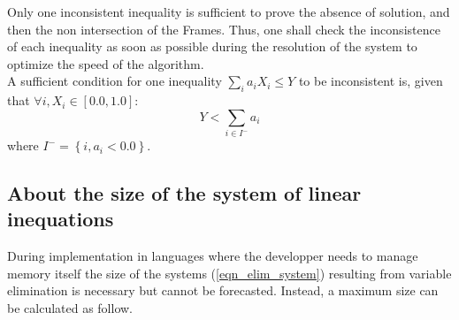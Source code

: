 \documentclass[12pt, a4paper]{article}
\begin{document}
Only one inconsistent inequality is sufficient to prove the absence of solution, and then the non intersection of the Frames. Thus, one shall check the inconsistence of each inequality as soon as possible during the resolution of the system to optimize the speed of the algorithm.\\

A sufficient condition for one inequality $\sum_ia_iX_i\le Y$ to be inconsistent is, given that $\forall i,X_i\in[0.0,1.0]$:
\begin{equation}
Y<\sum_{i\in I^-}a_i
\end{equation}
where $I^-=\left\lbrace i, a_i<0.0\right\rbrace$.\\

\subsection{About the size of the system of linear inequations}

During implementation in languages where the developper needs to manage memory itself the size of the systems (\ref{eqn_elim_system}) resulting from variable elimination is necessary but cannot be forecasted. Instead, a maximum size can be calculated as follow.\\
\end{document}
